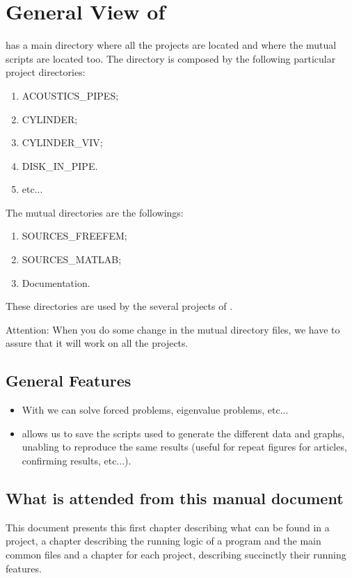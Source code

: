 \chapter{General View of }



 has a main directory where all the projects are located and where the mutual scripts are located too. The directory is composed by the following particular project directories:


\begin{enumerate}
\item ACOUSTICS\_PIPES;
\item CYLINDER;
\item CYLINDER\_VIV;
\item DISK\_IN\_PIPE.
\item etc...
\end{enumerate}
The mutual directories are the followings:

\begin{enumerate}
\item SOURCES\_FREEFEM;
\item SOURCES\_MATLAB;
\item Documentation.
\end{enumerate}

These directories are used by the several projects of .

\medskip

\begin{leftbar}
Attention: When you do some change in the mutual directory files, we have to assure that it will work on all the projects.
\end{leftbar}
\section{General Features}

\begin{itemize}
\item With  we can solve forced problems, eigenvalue problems, etc...

\item  {} allows us to save the scripts used to generate the different data and graphs, unabling to reproduce the same results (useful for repeat figures for articles, confirming results, etc...).
\end{itemize}



\section{What is attended from this manual document}
This document presents this first chapter describing what can be found in a   project, a chapter describing the running logic of a  program and the main common files and a chapter for each project, describing succinctly their running features.

